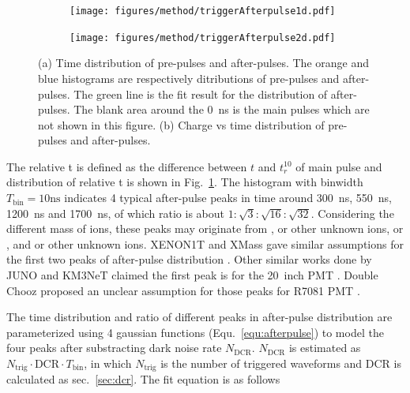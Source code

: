 \begin{figure}[!htbp]
    \centering
    \begin{subfigure}[t]{\LF\textwidth}
        \texttt{[image: figures/method/triggerAfterpulse1d.pdf]}
        \caption{}%
        \label{fig:afterpulse1d}
    \end{subfigure}
    \begin{subfigure}[t]{\LF\textwidth}
        \texttt{[image: figures/method/triggerAfterpulse2d.pdf]}
        \caption{}
        \label{fig:afterpulse2d}
    \end{subfigure}
    \caption{(a) Time distribution of pre-pulses and after-pulses. The orange and blue histograms are respectively ditributions of pre-pulses and after-pulses. The green line is the fit result for the distribution of after-pulses. The blank area around the \SI{0}{ns} is the main pulses which are not shown in this figure. (b) Charge vs time distribution of pre-pulses and after-pulses.}
\end{figure}

The relative t is defined as the difference between $t$ and $t_r^{10}$ of main pulse and distribution of relative t is shown in Fig.~\ref{fig:afterpulse1d}. The histogram with binwidth $T_{\mathrm{bin}}=10\mathrm{ns}$ indicates 4 typical after-pulse peaks in time around \SI{300}{ns}, \SI{550}{ns}, \SI{1200}{ns} and \SI{1700}{ns}, of which ratio is about $1:\sqrt{3}:\sqrt{16}:\sqrt{32}$. Considering the different mass of ions, these peaks may originate from ,  or other unknown ions,  or , and  or other unknown ions. XENON1T and XMass gave similar assumptions for the first two peaks of after-pulse distribution \cite{XENON1TTesting, Abe_2020}. Other similar works done by JUNO and KM3NeT claimed the first peak is  for the \SI{20}{inch} PMT \cite{Zhao:2022gks,KM3NetTesting}. Double Chooz proposed an unclear assumption for those peaks for R7081 PMT \cite{Haser_2013}.

The time distribution and ratio of different peaks in after-pulse distribution are parameterized using 4 gaussian functions (Equ.~\eqref{equ:afterpulse}) to model the four peaks after substracting dark noise rate $N_{\mathrm{DCR}}$. $N_{\mathrm{DCR}}$ is estimated as $N_{\mathrm{trig}}\cdot \mathrm{DCR}\cdot T_{\mathrm{bin}}$, in which $N_{\mathrm{trig}}$ is the number of triggered waveforms and DCR is calculated as sec.~\ref{sec:dcr}. The fit equation is as follows

